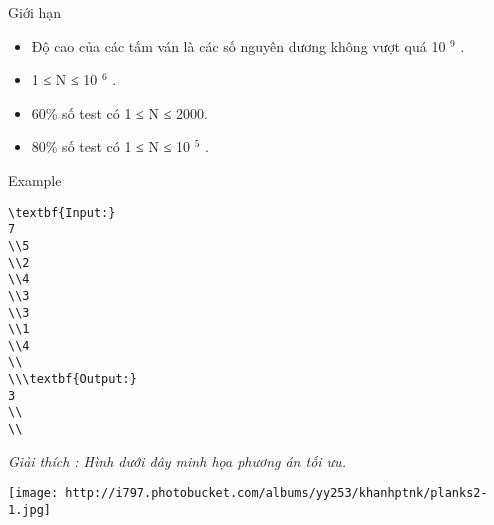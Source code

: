 Giới hạn
\begin{itemize}
	\item     Độ cao của các tấm ván là các số nguyên dương không vượt quá 10    $^     9    $    .   
	\item     1 ≤ N ≤ 10    $^     6    $    .   
	\item     60\% số test có 1 ≤ N ≤ 2000.   
	\item     80\% số test có 1 ≤ N ≤ 10    $^     5    $    .   
\end{itemize}
Example
\begin{verbatim}
\textbf{Input:}
7
\\5
\\2
\\4
\\3
\\3
\\1
\\4
\\
\\\textbf{Output:}
3
\\
\\\end{verbatim}

\emph{     Giải thích        : Hình dưới đây minh họa phương án tối ưu.   }


\texttt{[image: http://i797.photobucket.com/albums/yy253/khanhptnk/planks2-1.jpg]}
